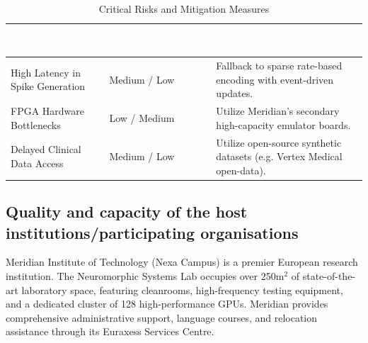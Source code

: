 \begin{table}[h]
\centering
\caption{Critical Risks and Mitigation Measures}
\label{tab:risks}
\vspace{0.2cm}
\begin{tabularx}{\textwidth}{lXX}
  \toprule
  \rowcolor{MSCAGold} \textcolor{white}{\textbf{Risk Description}} & \textcolor{white}{\textbf{Impact/Probability}} & \textcolor{white}{\textbf{Proposed Mitigation Measure}} \\ \midrule
  High Latency in Spike Generation & Medium / Low & Fallback to sparse rate-based encoding with event-driven updates. \\
  FPGA Hardware Bottlenecks & Low / Medium & Utilize Meridian's secondary high-capacity emulator boards. \\
  Delayed Clinical Data Access & Medium / Low & Utilize open-source synthetic datasets (e.g. Vertex Medical open-data). \\ \bottomrule
\end{tabularx}
\end{table}

\subsection{Quality and capacity of the host institutions/participating organisations}
Meridian Institute of Technology (Nexa Campus) is a premier European research institution. The Neuromorphic Systems Lab occupies over 250m$^2$ of state-of-the-art laboratory space, featuring cleanrooms, high-frequency testing equipment, and a dedicated cluster of 128 high-performance GPUs. Meridian provides comprehensive administrative support, language courses, and relocation assistance through its Euraxess Services Centre.
